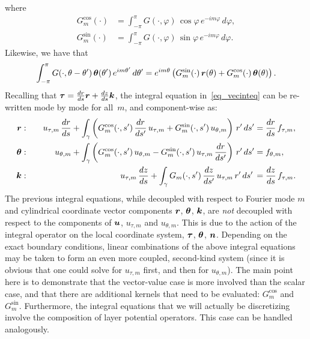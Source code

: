 \documentclass[11pt]{article}
\renewcommand{\phi}{\varphi}
\newcommand{\vct}{\vectorsym}
\newcommand\khat{\vct{{k}}}
\newcommand\rhat{\vct{{r}}}
\newcommand\tauhat{\vct{{ \tau}}}
\newcommand\thetahat{{\vct{{\theta}}}}
\newcommand\nhat{\vct{ {n}}}
\newcommand\bu{\vct{ u}}
\numberwithin{equation}{section}
\begin{document}
where
\begin{equation}
  \begin{aligned}
  G_m^{\cos}(\cdot) &= \int_{-\pi}^\pi G(\cdot,\phi) \, \cos\phi
  \, e^{-im\phi} \, d\phi, \\
  G_m^{\sin}(\cdot) &= \int_{-\pi}^\pi G(\cdot,\phi) \, \sin\phi
  \, e^{-im\phi} \, d\phi.
\end{aligned}
\end{equation}
Likewise, we have that
\begin{equation}
\int_{-\pi}^\pi G(\cdot,\theta-\theta') \, \thetahat(\theta') \,
e^{im\theta'} \, d\theta' =
e^{im\theta} \left(  G_m^{\sin}(\cdot) \, \rhat(\theta) +
        G_m^{\cos}(\cdot) \, \thetahat(\theta) \right).
\end{equation}
Recalling that $\tauhat = \frac{dr}{ds} \rhat + \frac{dz}{ds} \khat$,
the integral equation in~\eqref{eq_vecinteq} can be re-written mode by
mode for all~$m$, and component-wise as:
\begin{equation}
  \begin{aligned}
    \rhat &:&\quad u_{\tau,m} \, \frac{dr}{ds}  + \int_\gamma \left(
    G^{\cos}_m(\cdot,s') \, \frac{dr}{ds'} \, u_{\tau,m} +
    G^{\sin}_m(\cdot,s') \, u_{\theta,m} \right) \, r' \, ds'
     &= \frac{dr}{ds} \, f_{\tau,m} ,\\
    \thetahat &:& u_{\theta,m}  + \int_\gamma \left(
    G^{\cos}_m(\cdot,s') \, u_{\theta,m} -
    G^{\sin}_m(\cdot,s') \, u_{\tau,m} \, \frac{dr}{ds'} \right) \,
    r' \, ds'
     &= f_{\theta,m} ,\\
    \khat &:& u_{\tau,m} \, \frac{dz}{ds} + \int_\gamma 
    G_m(\cdot,s') \, \frac{dz}{ds'} \, u_{\tau,m} \, 
     r' \, ds' \,
    &= \frac{dz}{ds} \, f_{\tau,m}.
  \end{aligned}
\end{equation}
The previous integral equations, while decoupled with respect to
Fourier mode $m$ and cylindrical coordinate vector components $\rhat$,
$\thetahat$, $\khat$, are {\em not} decoupled with respect to the
components of $\bu$, $u_{\tau,m}$ and $u_{\theta,m}$. This is due to the
action of the integral operator on the local coordinate system,
$\tauhat$, $\thetahat$, $\nhat$.  Depending on the exact boundary
conditions, linear combinations of the above integral equations may be
taken to form an even more coupled, second-kind system (since it is
obvious that one could solve for $u_{\tau,m}$ first, and then for
$u_{\theta,m}$). The main point here is to demonstrate that the
vector-value case is more involved than the scalar case, and that
there are additional kernels that need to be evaluated: $G_m^{\cos}$
and $G_m^{\sin}$.  Furthermore, the integral equations that we will
actually be discretizing involve the composition of layer potential
operators. This case can be handled analogously.
\end{document}
